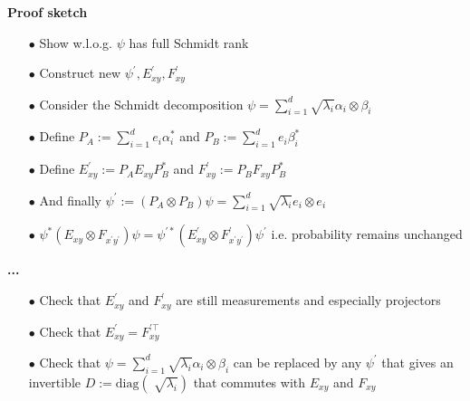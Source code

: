 \documentclass[13.5pt]{beamer}
\begin{document}
\begin{frame}
\begin{block}{\color{colororange}\textbf{Proof sketch}}
\begin{itemize}
\item [$\bullet$] Show w.l.o.g. $\psi$ has full Schmidt rank \pause
\item [$\bullet$] Construct new $\psi^\prime, $$E_{xy}^\prime, F_{xy}^\prime$ \pause
\item [$\bullet$] Consider the Schmidt decomposition $\psi = \sum_{i=1}^d \sqrt{\lambda_i}\alpha_i \otimes \beta_i$ \pause
\item [$\bullet$] Define $P_A := \sum_{i=1}^d e_i \alpha_i^*$ and $P_B := \sum_{i=1}^d e_i \beta_i^*$ \pause
\item [$\bullet$] Define $E_{xy}^\prime:=P_AE_{xy}P_B^*$ and $F_{xy}^\prime:=P_BF_{xy}P_B^*$ \pause
\item [$\bullet$] And finally $\psi^\prime := (P_A \otimes P_B)\psi = \sum_{i=1}^d \sqrt{\lambda_i} e_i \otimes e_i$ \pause
\item [$\bullet$] $\psi^* (E_{xy} \otimes F_{x^\prime y^\prime}) \psi = \psi^{\prime *} (E_{xy}^\prime \otimes F_{x^\prime y^\prime}^\prime) \psi^\prime$ i.e. probability remains unchanged 
\end{itemize}
\end{block}
\end{frame}

\begin{frame}
\begin{block}{\color{colororange}\textbf{...}}
\begin{itemize}

\item [$\bullet$] Check that $E_{xy}^\prime$ and $F_{xy}^\prime$ are still measurements and especially projectors \pause
\item [$\bullet$] Check that $E_{xy}^\prime = F_{xy}^{\prime\top}$ \pause
\item [$\bullet$] Check that $\psi = \sum_{i=1}^d \sqrt{\lambda_i}\alpha_i \otimes \beta_i$ can be replaced by any $\psi^\prime$ that gives an invertible $D:=\text{diag}(\sqrt[]{\lambda_i})$ that commutes with $E_{xy}$ and $F_{xy}$
\end{itemize}

\end{block}
\end{frame}
\end{document}
